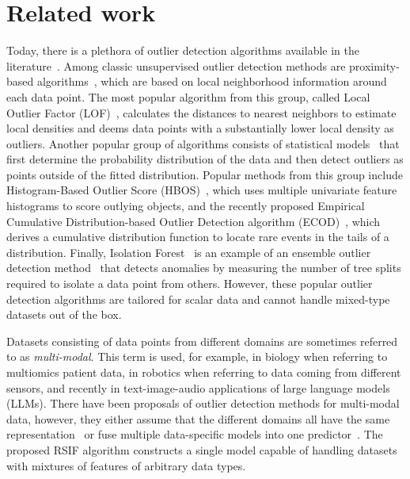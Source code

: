 \section{Related work}
\label{sec:related_work}
Today, there is a plethora of outlier detection algorithms available in the literature~\cite{aggarwal2017introduction}. Among classic unsupervised outlier detection methods are proximity-based algorithms~\cite{breunig2000lof}, which are based on local neighborhood information around each data point. The most popular algorithm from this group, called Local Outlier Factor (LOF)~\cite{breunig2000lof}, calculates the distances to nearest neighbors to estimate local densities and deems data points with a substantially lower local density as outliers. Another popular group of algorithms consists of statistical models~\cite{goldstein2012histogram,li2022ecod} that first determine the probability distribution of the data and then detect outliers as points outside of the fitted distribution. Popular methods from this group include Histogram-Based Outlier Score (HBOS)~\cite{goldstein2012histogram}, which uses multiple univariate feature histograms to score outlying objects, and the recently proposed Empirical Cumulative Distribution-based Outlier Detection algorithm (ECOD)~\cite{li2022ecod}, which derives a cumulative distribution function to locate rare events in the tails of a distribution. Finally, Isolation Forest~\cite{liu2008isolation} is an example of an ensemble outlier detection method~\cite{LazarevicBagging} that detects anomalies by measuring the number of tree splits required to isolate a data point from others. However, these popular outlier detection algorithms are tailored for scalar data and cannot handle mixed-type datasets out of the box.

Datasets consisting of data points from different domains are sometimes referred to as \textit{multi-modal}. This term is used, for example, in biology when referring to multiomics patient data, in robotics when referring to data coming from different sensors, and recently in text-image-audio applications of large language models (LLMs). There have been proposals of outlier detection methods for multi-modal data, however, they either assume that the different domains all have the same representation~\cite{wellhausen2020safe} or fuse multiple data-specific models into one predictor~\cite{ide2017multi}. The proposed RSIF algorithm constructs a single model capable of handling datasets with mixtures of features of arbitrary data types.

